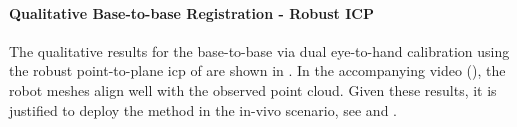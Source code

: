 
\paragraph{Qualitative Base-to-base Registration - Robust ICP} The qualitative results for the base-to-base via dual eye-to-hand calibration using the robust point-to-plane \gls{icp} of  are shown in . In the accompanying video (), the robot meshes align well with the observed point cloud. Given these results, it is justified to deploy the method in the in-vivo scenario, see  and .








